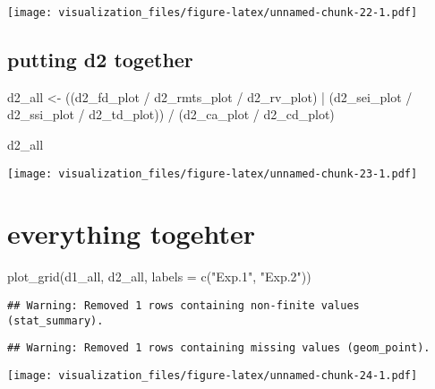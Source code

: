 \documentclass[
]{article}
\newenvironment{Shaded}{\begin{snugshade}}{\end{snugshade}}
\newcommand{\AttributeTok}[1]{\textcolor[rgb]{0.77,0.63,0.00}{#1}}
\newcommand{\FunctionTok}[1]{\textcolor[rgb]{0.00,0.00,0.00}{#1}}
\newcommand{\NormalTok}[1]{#1}
\newcommand{\OtherTok}[1]{\textcolor[rgb]{0.56,0.35,0.01}{#1}}
\newcommand{\SpecialCharTok}[1]{\textcolor[rgb]{0.00,0.00,0.00}{#1}}
\newcommand{\StringTok}[1]{\textcolor[rgb]{0.31,0.60,0.02}{#1}}
\begin{document}
\texttt{[image: visualization\_files/figure-latex/unnamed-chunk-22-1.pdf]}

\hypertarget{putting-d2-together}{%
\subsection{putting d2 together}\label{putting-d2-together}}

\begin{Shaded}
\begin{Highlighting}[]
\NormalTok{d2\_all }\OtherTok{\textless{}{-}}
\NormalTok{  ((d2\_fd\_plot }\SpecialCharTok{/}\NormalTok{ d2\_rmts\_plot }\SpecialCharTok{/}\NormalTok{ d2\_rv\_plot) }\SpecialCharTok{|}\NormalTok{ (d2\_sei\_plot }\SpecialCharTok{/}\NormalTok{ d2\_ssi\_plot }\SpecialCharTok{/}\NormalTok{ d2\_td\_plot)) }\SpecialCharTok{/}\NormalTok{  (d2\_ca\_plot }\SpecialCharTok{/}\NormalTok{ d2\_cd\_plot) }

\NormalTok{d2\_all}
\end{Highlighting}
\end{Shaded}

\texttt{[image: visualization\_files/figure-latex/unnamed-chunk-23-1.pdf]}

\hypertarget{everything-togehter}{%
\section{everything togehter}\label{everything-togehter}}

\begin{Shaded}
\begin{Highlighting}[]
\FunctionTok{plot\_grid}\NormalTok{(d1\_all, d2\_all, }\AttributeTok{labels =} \FunctionTok{c}\NormalTok{(}\StringTok{"Exp.1"}\NormalTok{, }\StringTok{"Exp.2"}\NormalTok{))}
\end{Highlighting}
\end{Shaded}

\begin{verbatim}
## Warning: Removed 1 rows containing non-finite values (stat_summary).
\end{verbatim}

\begin{verbatim}
## Warning: Removed 1 rows containing missing values (geom_point).
\end{verbatim}

\texttt{[image: visualization\_files/figure-latex/unnamed-chunk-24-1.pdf]}
\end{document}
